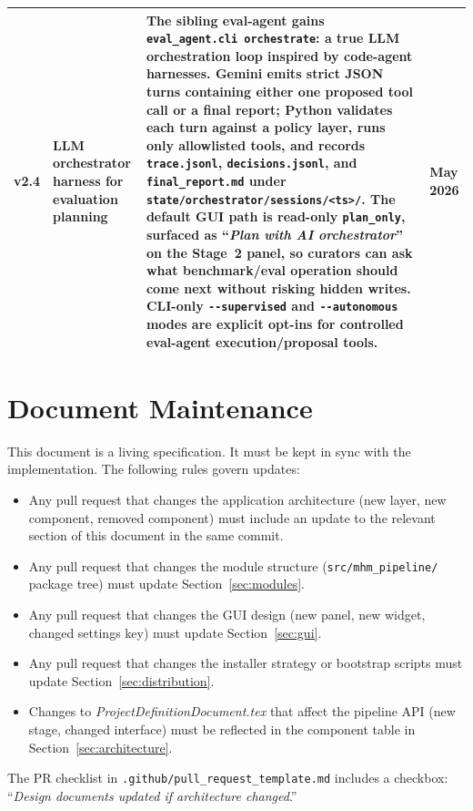 \documentclass[12pt]{article}
\newcommand{\filepath}[1]{\texttt{\small #1}}
\newcommand{\code}[1]{\texttt{#1}}
\begin{document}
\begin{longtable}{|l|l|p{5cm}|l|}
\hline
v2.4 & LLM orchestrator harness for evaluation planning & The sibling eval-agent gains \code{eval\_agent.cli orchestrate}: a true LLM orchestration loop inspired by code-agent harnesses. Gemini emits strict JSON turns containing either one proposed tool call or a final report; Python validates each turn against a policy layer, runs only allowlisted tools, and records \code{trace.jsonl}, \code{decisions.jsonl}, and \code{final\_report.md} under \code{state/orchestrator/sessions/<ts>/}. The default GUI path is read-only \code{plan\_only}, surfaced as ``\emph{Plan with AI orchestrator}'' on the Stage~2 panel, so curators can ask what benchmark/eval operation should come next without risking hidden writes. CLI-only \code{-{}-supervised} and \code{-{}-autonomous} modes are explicit opt-ins for controlled eval-agent execution/proposal tools. & May 2026 \\
\hline
\end{longtable}


\appendix
\section{Document Maintenance}
\label{sec:maintenance}

This document is a living specification. It must be kept in sync with the implementation. The following rules govern updates:

\begin{itemize}
\item Any pull request that changes the application architecture (new layer, new component, removed component) must include an update to the relevant section of this document in the same commit.
\item Any pull request that changes the module structure (\filepath{src/mhm\_pipeline/} package tree) must update Section~\ref{sec:modules}.
\item Any pull request that changes the GUI design (new panel, new widget, changed settings key) must update Section~\ref{sec:gui}.
\item Any pull request that changes the installer strategy or bootstrap scripts must update Section~\ref{sec:distribution}.
\item Changes to \emph{ProjectDefinitionDocument.tex} that affect the pipeline API (new stage, changed interface) must be reflected in the component table in Section~\ref{sec:architecture}.
\end{itemize}

The PR checklist in \filepath{.github/pull\_request\_template.md} includes a checkbox: ``\emph{Design documents updated if architecture changed}.''
\end{document}
